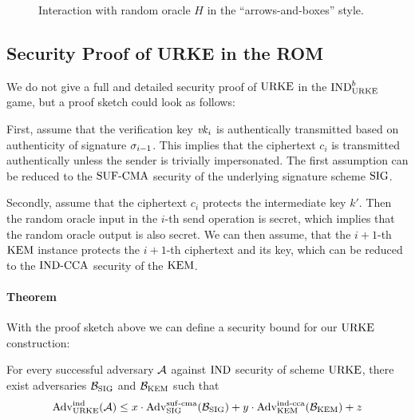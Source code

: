 \begin{figure}[!ht]
    \begin{minipage}[]{.5\textwidth}
        \centering
        \nicoresetlinenr%
        \fbox{%
            \scalebox{\codescalefactor}{%
            }%
        }
        \caption{%
            Simulation of a random oracle $H$.
        }
        \label{fig:rom:sim}
    \end{minipage}\hfill
    \begin{minipage}[]{.5\textwidth}
        \centering
        
        \caption{%
            Interaction with random oracle $H$ in the ``arrows-and-boxes'' style.
        }
        \label{fig:rom:overview}
    \end{minipage}
\end{figure}

\subsection{Security Proof of URKE in the ROM}
We do not give a full and detailed security proof of $\mathrm{URKE}$ in the ${\mathrm{IND}}_{\mathrm{URKE}}^b$ game, but a proof sketch could look as follows:

First, assume that the verification key $\mathit{vk}_i$ is authentically transmitted based on authenticity of signature $\sigma_{i-1}$.
This implies that the ciphertext $c_i$ is transmitted authentically unless the sender is trivially impersonated.
The first assumption can be reduced to the ${\mathrm{SUF}\text{-}\mathrm{CMA}}$ security of the underlying signature scheme $\mathrm{SIG}$.

Secondly, assume that the ciphertext $c_i$ protects the intermediate key $k'$.
Then the random oracle input in the $i$-th send operation is secret, which implies that the random oracle output is also secret.
We can then assume, that the $i+1$-th $\mathrm{KEM}$ instance protects the $i+1$-th ciphertext and its key, which can be reduced to the ${\mathrm{IND}\text{-}\mathrm{CCA}}$ security of the $\mathrm{KEM}$.

\paragraph{Theorem} With the proof sketch above we can define a security bound for our $\mathrm{URKE}$ construction:

For every successful adversary $\mathcal{A}$ against ${\mathrm{IND}}$ security of scheme $\mathrm{URKE}$, there exist adversaries $\mathcal{B}_{\mathrm{SIG}}$ and $\mathcal{B}_{\mathrm{KEM}}$ such that
\[\mathrm{Adv}_{\mathrm{URKE}}^{\mathrm{ind}} (\mathcal{A})\leq x\cdot \mathrm{Adv}_{\mathrm{SIG}}^{\mathrm{suf}\text{-}\mathrm{cma}}(\mathcal{B}_{\mathrm{SIG}}) + y\cdot \mathrm{Adv}_{\mathrm{KEM}}^{\mathrm{ind}\text{-}\mathrm{cca}}(\mathcal{B}_{\mathrm{KEM}})+z\]